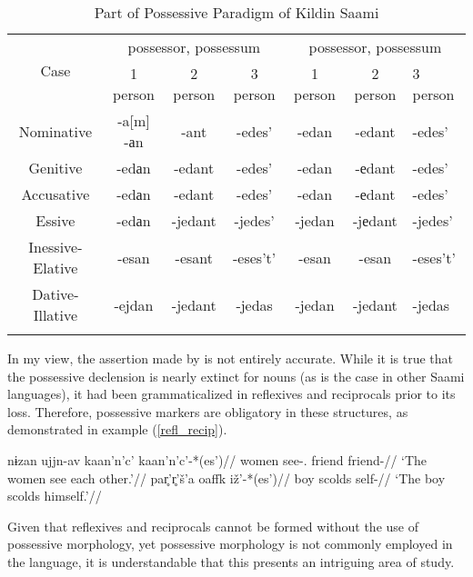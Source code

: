 \begin{table}[ht]
	\centering
	\begin{tabular}{ccccccl}
		\toprule
		\multicolumn{1}{c}{\multirow{2}{*}{Case}} & \multicolumn{3}{c}{\Sg{} possessor, \Pl{} possessum} & \multicolumn{3}{c}{\Pl{} possessor, \Pl{} possessum}\\
		\multicolumn{1}{c}{} & 1 person & 2 person & 3 person & 1 person & 2 person & 3 person \\\midrule
		
		Nominative & \parbox{1.5cm}{-a{[}m{]} \\ -аn} & -ant & -edes' & -edan & -edant & -edes' \\\addlinespace
		
		Genitive & -edаn & -edant & -edes' & -edan & -еdant & -edes' \\\addlinespace
		
		Accusative & -edаn & -edant & -edes' & -edan & -еdant & -edes' \\\addlinespace
		
		Essive & -edаn & -jedant & -jedes' & -jedan & -jеdant & -jedes' \\\addlinespace
		\parbox{2cm}{Inessive-Elative} & -esan & -esant & -eses't' & -esan & -esan & -eses't' \\\addlinespace
		
		\parbox{2cm}{Dative-Illative} & -ejdan & -jedant & -jedas & -jedan & -jedant & -jedas \\\addlinespace
		\bottomrule
	\end{tabular}
	\caption{Part of Possessive Paradigm of Kildin Saami}\label{saami_poss2}
\end{table}

In my view, the assertion made by \cite{riesler_kildin_2022} is not entirely accurate. While it is true that the possessive declension is nearly extinct for nouns (as is the case in other Saami languages), it had been grammaticalized in reflexives and reciprocals prior to its loss. Therefore, possessive markers are obligatory in these structures, as demonstrated in example (\ref{refl_recip}).

\pex \label{refl_recip}
\a \begingl
\gla nɨzan ujjn-av kaan'n'c' kaan'n'c'-*(es')//
\glb women see-\Npst.\Tpl{} friend friend-\Poss{}\Third{}//
\glft `The women see each other.'//
\endgl
\a \begingl
\gla par̥'r̥'š'a oaffk iž'-*(es')//
\glb boy scolds self-\Poss{}\Third{}//
\glft `The boy scolds himself.'//
\endgl
\xe

Given that reflexives and reciprocals cannot be formed without the use of possessive morphology, yet possessive morphology is not commonly employed in the language, it is understandable that this presents an intriguing area of study.

